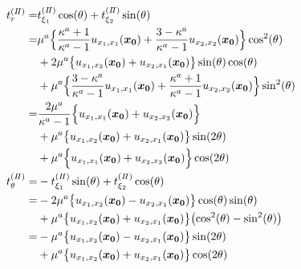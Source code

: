 \documentclass[titlepage,a4paper,12pt,oneside,dvipdfmx]{jsbook}
\begin{document}
\begin{align}
	t_{r}^{(I\hspace{-.15em}I)}
		=&t_{\xi_1}^{(I\hspace{-.15em}I)}\cos(\theta)+t_{\xi_2}^{(I\hspace{-.15em}I)}\sin(\theta)
			\nonumber
			\\
		=&\mu^a\Bigl\{\frac{\kappa^a+1}{\kappa^a-1} u_{x_{1},x_{1}}(\bm{x_{0}})
			+\frac{3-\kappa^a}{\kappa^a-1} u_{x_{2},x_{2}}(\bm{x_{0}})\Bigr\}\cos^2(\theta)
			\nonumber
			\\
			&+2\mu^a\bigl\{u_{x_{1},x_{2}}(\bm{x_{0}})
			+u_{x_{2},x_{1}}(\bm{x_{0}})\bigr\}\sin(\theta)\cos(\theta)
			\nonumber
			\\
			&+\mu^a\Bigl\{ \frac{3-\kappa^a}{\kappa^a-1} u_{x_{1},x_{1}}(\bm{x_{0}})
			+\frac{\kappa^a+1}{\kappa^a-1} u_{x_{2},x_{2}}(\bm{x_{0}})\Bigr\}\sin^2(\theta)
			\nonumber
			\\
		=&\frac{2\mu^a}{\kappa^a-1}\Bigl\{ u_{x_{1},x_{1}}(\bm{x_{0}})
			+ u_{x_{2},x_{2}}(\bm{x_{0}})\Bigr\}
			\nonumber
			\\
			&+\mu^a\bigl\{u_{x_{1},x_{2}}(\bm{x_{0}})
			+u_{x_{2},x_{1}}(\bm{x_{0}})\bigr\}\sin(2\theta)
			\nonumber
			\\
			&+\mu^a\Bigl\{ u_{x_{1},x_{1}}(\bm{x_{0}})
			+ u_{x_{2},x_{2}}(\bm{x_{0}})\Bigr\}\cos(2\theta)
			\\
	t_{\theta}^{(I\hspace{-.15em}I)}				
		=&-t_{\xi_1}^{(I\hspace{-.15em}I)}\sin(\theta)+t_{\xi_2}^{(I\hspace{-.15em}I)}\cos(\theta)
			\nonumber
			\\
		=&-2\mu^a \bigl\{u_{x_{1},x_{2}}(\bm{x_{0}})-u_{x_{2},x_{1}}(\bm{x_{0}})\bigr\}\cos(\theta)\sin(\theta)
			\nonumber
			\\
			&+\mu^a \bigl\{u_{x_{1},x_{2}}(\bm{x_{0}})+u_{x_{2},x_{1}}(\bm{x_{0}})\bigr\}
			\bigl(\cos^2(\theta)-\sin^2(\theta)\bigr)
			\nonumber
			\\
		=&-\mu^a \bigl\{u_{x_{1},x_{2}}(\bm{x_{0}})-u_{x_{2},x_{1}}(\bm{x_{0}})\bigr\}\sin(2\theta)
			\nonumber
			\\
			&+\mu^a \bigl\{u_{x_{1},x_{2}}(\bm{x_{0}})+u_{x_{2},x_{1}}(\bm{x_{0}})\bigr\}\cos(2\theta)
\end{align}
\end{document}
